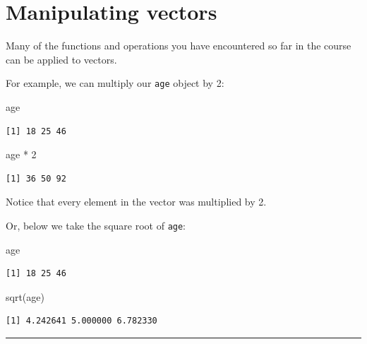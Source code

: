 \documentclass[
  letterpaper,
  DIV=11,
  numbers=noendperiod]{scrreprt}
\newenvironment{Shaded}{\begin{snugshade}}{\end{snugshade}}
\newcommand{\DecValTok}[1]{\textcolor[rgb]{0.68,0.00,0.00}{#1}}
\newcommand{\FunctionTok}[1]{\textcolor[rgb]{0.28,0.35,0.67}{#1}}
\newcommand{\NormalTok}[1]{\textcolor[rgb]{0.00,0.23,0.31}{#1}}
\newcommand{\SpecialCharTok}[1]{\textcolor[rgb]{0.37,0.37,0.37}{#1}}
\begin{document}
\section{Manipulating vectors}\label{manipulating-vectors}

Many of the functions and operations you have encountered so far in the
course can be applied to vectors.

For example, we can multiply our \texttt{age} object by 2:

\begin{Shaded}
\begin{Highlighting}[]
\NormalTok{age}
\end{Highlighting}
\end{Shaded}

\begin{verbatim}
[1] 18 25 46
\end{verbatim}

\begin{Shaded}
\begin{Highlighting}[]
\NormalTok{age }\SpecialCharTok{*} \DecValTok{2}
\end{Highlighting}
\end{Shaded}

\begin{verbatim}
[1] 36 50 92
\end{verbatim}

Notice that every element in the vector was multiplied by 2.

Or, below we take the square root of \texttt{age}:

\begin{Shaded}
\begin{Highlighting}[]
\NormalTok{age}
\end{Highlighting}
\end{Shaded}

\begin{verbatim}
[1] 18 25 46
\end{verbatim}

\begin{Shaded}
\begin{Highlighting}[]
\FunctionTok{sqrt}\NormalTok{(age)}
\end{Highlighting}
\end{Shaded}

\begin{verbatim}
[1] 4.242641 5.000000 6.782330
\end{verbatim}

\begin{center}\rule{0.5\linewidth}{0.5pt}\end{center}
\end{document}
